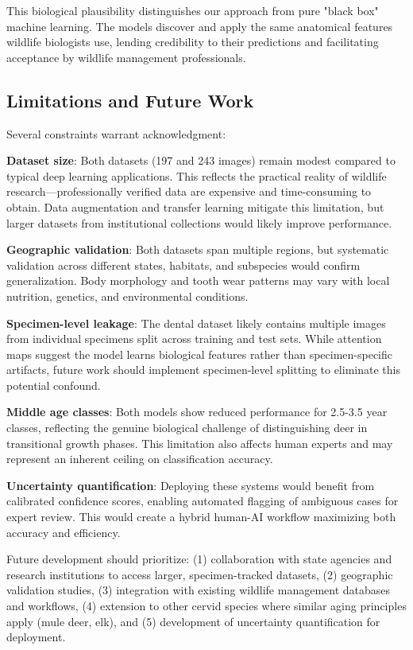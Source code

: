 \documentclass[11pt]{article}
\begin{document}
This biological plausibility distinguishes our approach from pure "black box" machine learning. The models discover and apply the same anatomical features wildlife biologists use, lending credibility to their predictions and facilitating acceptance by wildlife management professionals.

\subsection{Limitations and Future Work}

Several constraints warrant acknowledgment:

\textbf{Dataset size}: Both datasets (197 and 243 images) remain modest compared to typical deep learning applications. This reflects the practical reality of wildlife research—professionally verified data are expensive and time-consuming to obtain. Data augmentation and transfer learning mitigate this limitation, but larger datasets from institutional collections would likely improve performance.

\textbf{Geographic validation}: Both datasets span multiple regions, but systematic validation across different states, habitats, and subspecies would confirm generalization. Body morphology and tooth wear patterns may vary with local nutrition, genetics, and environmental conditions.

\textbf{Specimen-level leakage}: The dental dataset likely contains multiple images from individual specimens split across training and test sets. While attention maps suggest the model learns biological features rather than specimen-specific artifacts, future work should implement specimen-level splitting to eliminate this potential confound.

\textbf{Middle age classes}: Both models show reduced performance for 2.5-3.5 year classes, reflecting the genuine biological challenge of distinguishing deer in transitional growth phases. This limitation also affects human experts and may represent an inherent ceiling on classification accuracy.

\textbf{Uncertainty quantification}: Deploying these systems would benefit from calibrated confidence scores, enabling automated flagging of ambiguous cases for expert review. This would create a hybrid human-AI workflow maximizing both accuracy and efficiency.

Future development should prioritize: (1) collaboration with state agencies and research institutions to access larger, specimen-tracked datasets, (2) geographic validation studies, (3) integration with existing wildlife management databases and workflows, (4) extension to other cervid species where similar aging principles apply (mule deer, elk), and (5) development of uncertainty quantification for deployment.
\end{document}
